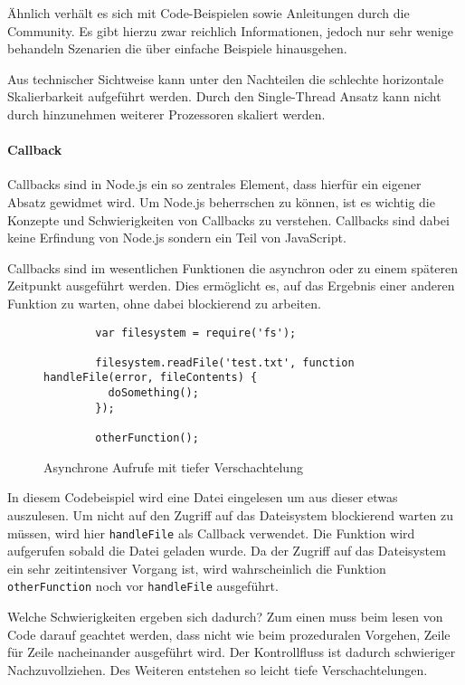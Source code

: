 Ähnlich verhält es sich mit Code-Beispielen sowie Anleitungen durch die
Community. Es gibt hierzu zwar reichlich Informationen, jedoch nur sehr
wenige behandeln Szenarien die über einfache Beispiele hinausgehen.

Aus technischer Sichtweise kann unter den Nachteilen die schlechte
horizontale Skalierbarkeit aufgeführt werden. Durch den Single-Thread
Ansatz kann nicht durch hinzunehmen weiterer Prozessoren skaliert
werden.

\paragraph{Callback}\label{callback}

Callbacks sind in Node.js ein so zentrales Element, dass hierfür ein
eigener Absatz gewidmet wird. Um Node.js beherrschen zu können, ist es
wichtig die Konzepte und Schwierigkeiten von Callbacks zu verstehen.
Callbacks sind dabei keine Erfindung von Node.js sondern ein Teil von
JavaScript.

Callbacks sind im wesentlichen Funktionen die asynchron oder zu einem
späteren Zeitpunkt ausgeführt werden. Dies ermöglicht es, auf das
Ergebnis einer anderen Funktion zu warten, ohne dabei blockierend zu
arbeiten.

\begin{figure}[t]
	\centering
	\begin{lstlisting}
        var filesystem = require('fs');

        filesystem.readFile('test.txt', function handleFile(error, fileContents) {
          doSomething();
        });

        otherFunction();
    \end{lstlisting}
	\caption[node-example-1]{Asynchrone Aufrufe mit tiefer Verschachtelung}
	\label{f:node-example-1}
\end{figure}

In diesem Codebeispiel wird eine Datei eingelesen um aus dieser etwas
auszulesen. Um nicht auf den Zugriff auf das Dateisystem blockierend
warten zu müssen, wird hier \texttt{handleFile} als Callback verwendet.
Die Funktion wird aufgerufen sobald die Datei geladen wurde. Da der
Zugriff auf das Dateisystem ein sehr zeitintensiver Vorgang ist, wird
wahrscheinlich die Funktion \texttt{otherFunction} noch vor
\texttt{handleFile} ausgeführt.

Welche Schwierigkeiten ergeben sich dadurch? Zum einen muss beim lesen
von Code darauf geachtet werden, dass nicht wie beim prozeduralen
Vorgehen, Zeile für Zeile nacheinander ausgeführt wird. Der Kontrollfluss
ist dadurch schwieriger Nachzuvollziehen. Des Weiteren entstehen so
leicht tiefe Verschachtelungen.

